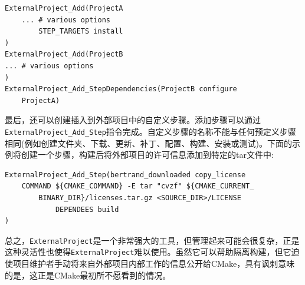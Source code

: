 \begin{lstlisting}[style=styleCMake]
ExternalProject_Add(ProjectA
	... # various options
		STEP_TARGETS install
)
ExternalProject_Add(ProjectB
... # various options
)
ExternalProject_Add_StepDependencies(ProjectB configure
	ProjectA)
\end{lstlisting}

最后，还可以创建插入到外部项目中的自定义步骤。添加步骤可以通过\texttt{ExternalProject\_Add\_Step}指令完成。自定义步骤的名称不能与任何预定义步骤相同(例如创建文件夹、下载、更新、补丁、配置、构建、安装或测试)。下面的示例将创建一个步骤，构建后将外部项目的许可信息添加到特定的tar文件中:

\begin{lstlisting}[style=styleCMake]
ExternalProject_Add_Step(bertrand_downloaded copy_license
	COMMAND ${CMAKE_COMMAND} -E tar "cvzf" ${CMAKE_CURRENT_
		BINARY_DIR}/licenses.tar.gz <SOURCE_DIR>/LICENSE
			DEPENDEES build
)
\end{lstlisting}

总之，\texttt{ExternalProject}是一个非常强大的工具，但管理起来可能会很复杂，正是这种灵活性也使得\texttt{ExternalProject}难以使用。虽然它可以帮助隔离构建，但它迫使项目维护者手动将来自外部项目内部工作的信息公开给CMake，具有讽刺意味的是，这正是CMake最初所不愿看到的情况。












